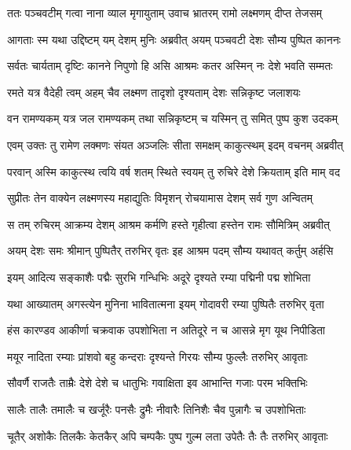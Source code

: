 
\twolineshloka
{ततः पञ्चवटीम् गत्वा नाना व्याल मृगायुताम्}
{उवाच भ्रातरम् रामो लक्ष्मणम् दीप्त तेजसम्} %

\twolineshloka
{आगताः स्म यथा उद्दिष्टम् यम् देशम् मुनिः अब्रवीत्}
{अयम् पञ्चवटी देशः सौम्य पुष्पित काननः} %

\twolineshloka
{सर्वतः चार्यताम् दृष्टिः कानने निपुणो हि असि}
{आश्रमः कतर अस्मिन् नः देशे भवति सम्मतः} %

\twolineshloka
{रमते यत्र वैदेही त्वम् अहम् चैव लक्ष्मण}
{तादृशो दृश्यताम् देशः सन्निकृष्ट जलाशयः} %

\twolineshloka
{वन रामण्यकम् यत्र जल रामण्यकम् तथा}
{सन्निकृष्टम् च यस्मिन् तु समित् पुष्प कुश उदकम्} %

\twolineshloka
{एवम् उक्तः तु रामेण लक्मणः संयत अञ्जलिः}
{सीता समक्षम् काकुत्स्थम् इदम् वचनम् अब्रवीत्} %

\twolineshloka
{परवान् अस्मि काकुत्स्थ त्वयि वर्ष शतम् स्थिते}
{स्वयम् तु रुचिरे देशे क्रियताम् इति माम् वद} %

\twolineshloka
{सुप्रीतः तेन वाक्येन लक्ष्मणस्य महाद्युतिः}
{विमृशन् रोचयामास देशम् सर्व गुण अन्वितम्} %

\twolineshloka
{स तम् रुचिरम् आक्रम्य देशम् आश्रम कर्मणि}
{हस्ते गृहीत्वा हस्तेन रामः सौमित्रिम् अब्रवीत्} %

\twolineshloka
{अयम् देशः समः श्रीमान् पुष्पितैर् तरुभिर् वृतः}
{इह आश्रम पदम् सौम्य यथावत् कर्तुम् अर्हसि} %

\twolineshloka
{इयम् आदित्य सङ्काशैः पद्मैः सुरभि गन्धिभिः}
{अदूरे दृश्यते रम्या पद्मिनी पद्म शोभिता} %

\twolineshloka
{यथा आख्यातम् अगस्त्येन मुनिना भावितात्मना}
{इयम् गोदावरी रम्या पुष्पितैः तरुभिर् वृता} %

\twolineshloka
{हंस कारण्डव आकीर्णा चक्रवाक उपशोभिता}
{न अतिदूरे न च आसन्ने मृग यूथ निपीडिता} %

\twolineshloka
{मयूर नादिता रम्याः प्रांशवो बहु कन्दराः}
{दृश्यन्ते गिरयः सौम्य फुल्लैः तरुभिर् आवृताः} %

\twolineshloka
{सौवर्णै राजतैः ताम्रैः देशे देशे च धातुभिः}
{गवाक्षिता इव आभान्ति गजाः परम भक्तिभिः} %

\twolineshloka
{सालैः तालैः तमालैः च खर्जूरैः पनसैः द्रुमैः}
{नीवारैः तिनिशैः चैव पुन्नागैः च उपशोभिताः} %

\twolineshloka
{चूतैर् अशोकैः तिलकैः केतकैर् अपि चम्पकैः}
{पुष्प गुल्म लता उपेतैः तैः तैः तरुभिर् आवृताः} %

